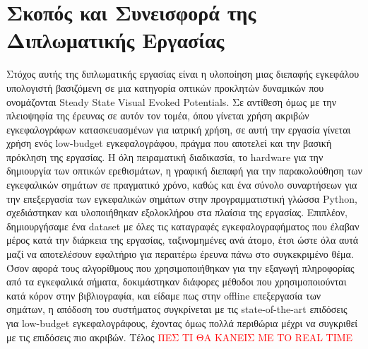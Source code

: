 \documentclass[11pt,a4paper,english,greek,twoside]{../Thesis}
\begin{document}
\section{Σκοπός και Συνεισφορά της Διπλωματικής Εργασίας}
Στόχος αυτής της διπλωματικής εργασίας είναι η υλοποίηση μιας διεπαφής εγκεφάλου υπολογιστή βασιζόμενη σε μια κατηγορία οπτικών προκλητών δυναμικών που ονομάζονται Steady State Visual Evoked Potentials. Σε αντίθεση όμως με την πλειοψηφία της έρευνας σε αυτόν τον τομέα, όπου γίνεται χρήση ακριβών εγκεφαλογράφων κατασκευασμένων για ιατρική χρήση, σε αυτή την εργασία γίνεται χρήση ενός low-budget εγκεφαλογράφου, πράγμα που αποτελεί και την βασική πρόκληση της εργασίας. Η όλη πειραματική διαδικασία, το hardware για την δημιουργία των οπτικών ερεθισμάτων, η γραφική διεπαφή για την παρακολούθηση των εγκεφαλικών σημάτων σε πραγματικό χρόνο, καθώς και ένα σύνολο συναρτήσεων για την επεξεργασία των εγκεφαλικών σημάτων στην προγραμματιστική γλώσσα Python, σχεδιάστηκαν και υλοποιήθηκαν εξολοκλήρου στα πλαίσια της εργασίας. Επιπλέον, δημιουργήσαμε ένα dataset με όλες τις καταγραφές εγκεφαλογραφήματος που έλαβαν μέρος κατά την διάρκεια της εργασίας, ταξινομημένες ανά άτομο, έτσι ώστε όλα αυτά μαζί να αποτελέσουν εφαλτήριο για περαιτέρω έρευνα πάνω στο συγκεκριμένο θέμα. Όσον αφορά τους αλγορίθμους που χρησιμοποιήθηκαν για την εξαγωγή πληροφορίας από τα εγκεφαλικά σήματα, δοκιμάστηκαν διάφορες μέθοδοι που χρησιμοποιούνται κατά κόρον στην βιβλιογραφία, και είδαμε πως στην offline επεξεργασία των σημάτων, η απόδοση του συστήματος συγκρίνεται με τις state-of-the-art επιδόσεις για low-budget εγκεφαλογράφους, έχοντας όμως πολλά περιθώρια μέχρι να συγκριθεί με τις επιδόσεις πιο ακριβών. Τέλος \textcolor{red}{ΠΕΣ ΤΙ ΘΑ ΚΑΝΕΙΣ ΜΕ ΤΟ REAL TIME}
\end{document}
